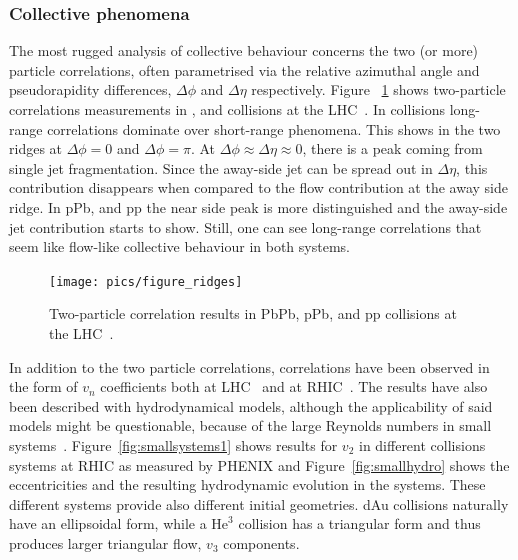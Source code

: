 
\subsubsection{Collective phenomena}
The most rugged analysis of collective behaviour concerns the two (or more) particle correlations, often parametrised via the relative azimuthal angle and pseudorapidity differences, $\Delta \phi$ and $\Delta \eta$ respectively. Figure ~\ref{fig:smallsystems2} shows two-particle correlations measurements in \PbPb, \pPb and \pp collisions at the LHC~\cite{Aad:2015gqa}. In \PbPb collisions long-range correlations dominate over short-range phenomena. This shows in the two ridges at $\Delta \phi = 0 $ and $\Delta \phi = \pi$. At $\Delta\phi\approx\Delta\eta\approx0$, there is a peak coming from single jet fragmentation. Since the away-side jet can be spread out in $\Delta\eta$, this contribution disappears when compared to the flow contribution at the away side ridge. In pPb, and pp the near side peak is more distinguished and the away-side jet contribution starts to show. Still, one can see long-range correlations that seem like flow-like collective behaviour in both systems. 
\begin{figure}[b!]
\centering
            	\texttt{[image: pics/figure\_ridges]}
                \caption{Two-particle correlation results in PbPb, pPb, and pp collisions at the LHC~\cite{Aad:2015gqa}. }
	\label{fig:smallsystems2}
\end{figure}

In addition to the two particle correlations, correlations have been observed in the form of $v_n$ coefficients both at LHC~\cite{Acharya:2017ino} and at RHIC~\cite{Aidala:2016vgl}. The results have also been described  with hydrodynamical models, although the applicability of said models might be questionable, because of the large Reynolds numbers in small systems~\cite{Shen:2016zpp,Niemi:2014wta}. Figure~\ref{fig:smallsystems1} shows results for $v_2$ in different collisions systems at RHIC as measured by PHENIX and Figure~\ref{fig:smallhydro} shows the eccentricities and the resulting hydrodynamic evolution in the systems. These different systems provide also different initial geometries. dAu collisions naturally have an ellipsoidal form, while a $\mathrm{He}^3$ collision has a triangular form and thus produces larger triangular flow, $v_3$ components. 

